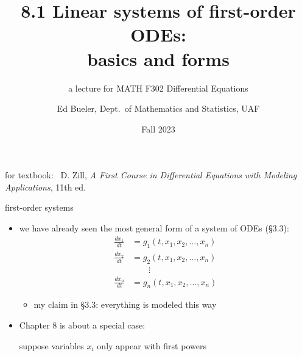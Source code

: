 \documentclass[dvipsnames,colorlinks]{beamer}
\title{8.1 Linear systems of first-order ODEs: \\ basics and forms}
\subtitle{a lecture for MATH F302 Differential Equations}
\author{Ed Bueler, Dept.~of Mathematics and Statistics, UAF}
\date{Fall 2023}
\begin{document}


\begin{frame}
\titlepage

\centerline{\tiny for textbook: \, D. Zill, \emph{A First Course in Differential Equations with Modeling Applications}, 11th ed.}
\end{frame}


\begin{frame}{first-order systems}

\begin{itemize}
\item we have already seen the most general form of a system of ODEs (\S3.3):
\begin{align*}
\frac{dx_1}{dt} &= g_1(t,x_1,x_2,\dots,x_n) \\
\frac{dx_2}{dt} &= g_2(t,x_1,x_2,\dots,x_n) \\
                &\qquad \vdots \\
\frac{dx_n}{dt} &= g_n(t,x_1,x_2,\dots,x_n)
\end{align*}
     \begin{itemize}
     \item my claim in \S3.3: everything is modeled this way
     \end{itemize}
\item Chapter 8 is about a special case:

\centerline{\alert{suppose variables $x_i$ only appear with first powers}}
\end{itemize}
\end{frame}
\end{document}
